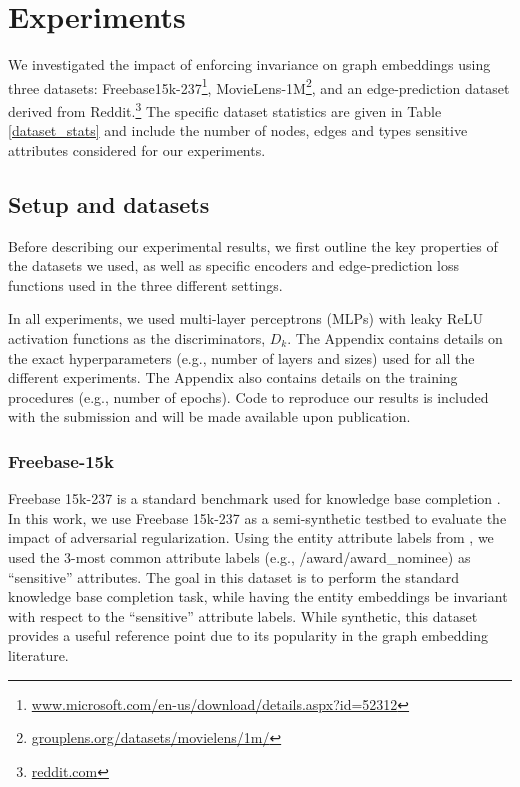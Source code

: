 \section{Experiments}\label{sec:experiments}

We investigated the impact of enforcing invariance on graph embeddings using three  datasets: Freebase15k-237\footnote{\tiny{\url{www.microsoft.com/en-us/download/details.aspx?id=52312}}}, MovieLens-1M\footnote{\tiny{\url{grouplens.org/datasets/movielens/1m/}}}, and an edge-prediction dataset derived from Reddit.\footnote{\tiny{\url{reddit.com}}} The specific dataset statistics are given in Table \ref{dataset_stats} and include the number of nodes, edges and types sensitive attributes considered for our experiments.


\subsection{Setup and datasets}

Before describing our experimental results, we first outline the key properties of the datasets we used, as well as specific encoders and edge-prediction loss functions used in the three different settings.  

In all experiments, we used multi-layer perceptrons (MLPs) with leaky ReLU activation functions \cite{xu2015empirical} as the discriminators, $D_k$. 
The Appendix contains details on the exact hyperparameters (e.g., number of layers and sizes) used for all the different experiments.
The Appendix also contains details on the training procedures (e.g., number of epochs).
Code to reproduce our results is included with the submission and will be made available upon publication. 

\subsubsection{Freebase-15k}

Freebase 15k-237 is a standard benchmark used for knowledge base completion \cite{toutanova2015representing}.
In this work, we use Freebase 15k-237 as a semi-synthetic testbed to evaluate the impact of adversarial regularization. 
Using the entity attribute labels from \citet{moon2017learning}, we used the $3$-most common attribute labels (e.g., /award/award\_nominee) as ``sensitive'' attributes.
The goal in this dataset is to perform the standard knowledge base completion task, while having the entity embeddings be invariant with respect to the ``sensitive'' attribute labels.
While synthetic, this dataset provides a useful reference point due to its popularity in the graph embedding literature. 

